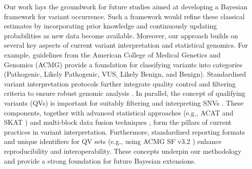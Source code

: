 Our work lays the groundwork for future studies aimed at developing a Bayesian framework for variant occurrence. Such a framework would refine these classical estimates by incorporating prior knowledge and continuously updating probabilities as new data become available. Moreover, our approach builds on several key aspects of current variant interpretation and statistical genomics. For example, guidelines from the American College of Medical Genetics and Genomics (ACMG) \citep{richards2015standards, tavtigian2020fitting} provide a foundation for classifying variants into categories (Pathogenic, Likely Pathogenic, VUS, Likely Benign, and Benign). Standardised variant interpretation protocols further integrate quality control and filtering criteria to ensure robust genomic analysis \citep{pedersen2021effective,anderson2010data}. In parallel, the concept of qualifying variants (QVs) is important for suitably filtering and interpreting SNVs \citep{cirulli2015exome, Povysil2019rare}. These components, together with advanced statistical approaches (e.g., ACAT and SKAT \citep{liu2019acat,li2020dynamic,wu2011rare,lee2012optimal}) and multi-block data fusion techniques \citep{kong2018nature,howe2021within}, form the pillars of current practices in variant interpretation. Furthermore, standardized reporting formats and unique identifiers for QV sets (e.g., using ACMG SF v3.2 \citep{miller2023acmg}) enhance reproducibility and interoperability. These concepts underpin our methodology and provide a strong foundation for future Bayesian extensions.



%


